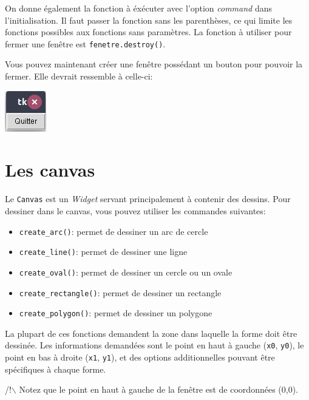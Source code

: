 \documentclass{article}
\begin{document}
\noindent
On donne également la fonction à éxécuter avec l'option \emph{command} dans l'initialisation. Il faut passer la fonction sans les parenthèses, ce qui limite les fonctions possibles aux fonctions sans paramètres. La fonction à utiliser pour fermer une fenêtre est \verb~fenetre.destroy()~.


\noindent
Vous pouvez maintenant créer une fenêtre possédant un bouton pour pouvoir la fermer. Elle devrait ressemble à celle-ci:

\begin{center}
\includegraphics[width=.3\linewidth]{./img/premiereFenetre.png}
\end{center}

\section{Les canvas}
\label{sec-3}
Le \verb~Canvas~ est un \emph{Widget} servant principalement à contenir des dessins.
Pour dessiner dans le canvas, vous pouvez utiliser les commandes suivantes:
\begin{itemize}
\item \verb~create_arc()~: permet de dessiner un arc de cercle
\item \verb~create_line()~: permet de dessiner une ligne
\item \verb~create_oval()~: permet de dessiner un cercle ou un ovale
\item \verb~create_rectangle()~: permet de dessiner un rectangle
\item \verb~create_polygon()~: permet de dessiner un polygone
\end{itemize}

\noindent
La plupart de ces fonctions demandent la zone dans laquelle la forme doit être dessinée.
Les informations demandées sont le point en haut à gauche (\verb~x0~, \verb~y0~), le point en bas à droite (\verb~x1~, \verb~y1~), et des options additionnelles pouvant être spécifiques à chaque forme.

\noindent
/!$\backslash$ Notez que le point en haut à gauche de la fenêtre est de coordonnées (0,0).
\end{document}
